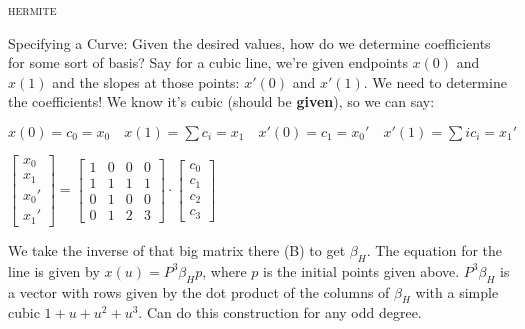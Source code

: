 \documentclass{article}
\begin{document}
\begin{center}\textsc{hermite}\end{center} 
Specifying a Curve: Given the desired values, how do we determine coefficients for some sort of basis? Say for a cubic line, we're given endpoints $x(0)$ and $x(1)$ and the slopes at those points: $x'(0)$  and $x'(1)$. We need to determine the coefficients! We know it's cubic (should be {\bf given}), so we can say:
\begin{center}
$x(0)=c_0=x_0 \quad x(1)=\sum c_i = x_1 \quad x'(0)=c_1=x_0' \quad x'(1)=\sum ic_i=x_1'$	

$\begin{bmatrix} x_0 \\ x_1 \\ x_0' \\ x_1' \end{bmatrix} = \begin{bmatrix} 1 & 0 & 0 & 0 \\ 1 & 1 & 1 & 1 \\ 0 & 1 & 0 & 0 \\ 0 & 1 & 2 & 3 \end{bmatrix} \cdot \begin{bmatrix} c_0 \\ c_1 \\ c_2 \\ c_3 \end{bmatrix} $
	\end{center}
	We take the inverse of that big matrix there (B) to get $\beta_H$. The equation for the line is given by $x(u) = P^3\beta_Hp$, where $p$ is the initial points given above. $P^3\beta_H$ is a vector with rows given by the dot product of the columns of  $\beta_H$ with a simple cubic $1+u+u^2+u^3$. Can do this construction for any odd degree.

\end{document}
